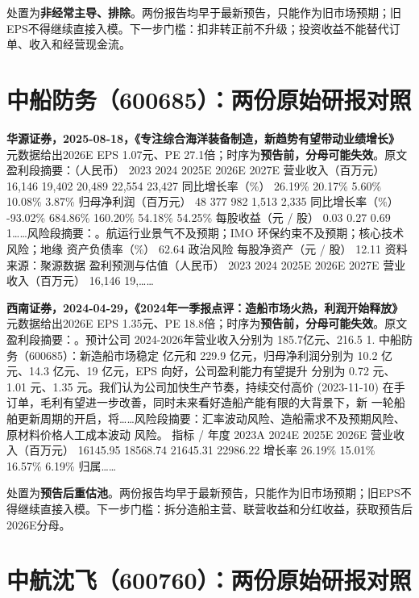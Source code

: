 \begin{keyinsight}[AStock处理]
处置为\textbf{非经常主导、排除}。两份报告均早于最新预告，只能作为旧市场预期；旧EPS不得继续直接入模。下一步门槛：扣非转正前不升级；投资收益不能替代订单、收入和经营现金流。
\end{keyinsight}

\section{中船防务（600685）：两份原始研报对照}

\textbf{华源证券，2025-08-18，《专注综合海洋装备制造，新趋势有望带动业绩增长》}
元数据给出2026E EPS 1.07元、PE 27.1倍；时序为\textbf{预告前，分母可能失效}。原文盈利段摘要：（人民币） 2023 2024 2025E 2026E 2027E 营业收入（百万元） 16,146 19,402 20,489 22,554 23,427 同比增长率（\%） 26.19\% 20.17\% 5.60\% 10.08\% 3.87\% 归母净利润（百万元） 48 377 982 1,513 2,335 同比增长率（\%） -93.02\% 684.86\% 160.20\% 54.18\% 54.25\% 每股收益（元 / 股） 0.03 0.27 0.69 1……风险段摘要：。航运行业景气不及预期；IMO 环保约束不及预期；核心技术风险；地缘 资产负债率（\%） 62.64 政治风险 每股净资产（元 / 股） 12.11 资料来源：聚源数据 盈利预测与估值（人民币） 2023 2024 2025E 2026E 2027E 营业收入（百万元） 16,146 19,……

\textbf{西南证券，2024-04-29，《2024年一季报点评：造船市场火热，利润开始释放》}
元数据给出2026E EPS 1.35元、PE 18.8倍；时序为\textbf{预告前，分母可能失效}。原文盈利段摘要：。预计公司 2024-2026年营业收入分别为 185.7亿元、216.5 1. 中船防务（600685）：新造船市场稳定 亿元和 229.9 亿元，归母净利润分别为 10.2 亿元、14.3 亿元、19 亿元，EPS 向好，公司盈利能力有望提升 分别为 0.72 元、1.01 元、1.35 元。我们认为公司加快生产节奏，持续交付高价 (2023-11-10) 在手订单，毛利有望进一步改善，同时未来看好造船产能有限的大背景下，新 一轮船舶更新周期的开启，将……风险段摘要：汇率波动风险、造船需求不及预期风险、原材料价格人工成本波动 风险。 指标 / 年度 2023A 2024E 2025E 2026E 营业收入（百万元） 16145.95 18568.74 21645.31 22986.22 增长率 26.19\% 15.01\% 16.57\% 6.19\% 归属……

\begin{keyinsight}[AStock处理]
处置为\textbf{预告后重估池}。两份报告均早于最新预告，只能作为旧市场预期；旧EPS不得继续直接入模。下一步门槛：拆分造船主营、联营收益和分红收益，获取预告后2026E分母。
\end{keyinsight}

\section{中航沈飞（600760）：两份原始研报对照}

